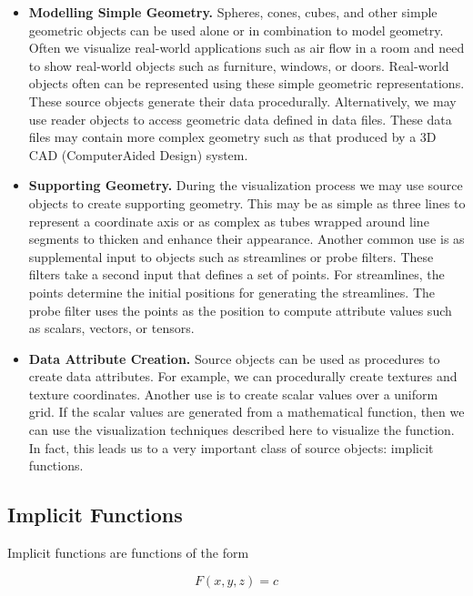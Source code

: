 \begin{itemize}

\item[] \textbf{Modelling Simple Geometry.}
Spheres, cones, cubes, and other simple geometric objects can be used alone or in combination to model geometry. Often we visualize real-world applications such as air flow in a room and need to show real-world objects such as furniture, windows, or doors.
Real-world objects often can be represented using these simple geometric representations. These source objects generate their data procedurally. Alternatively, we may use reader objects to access geometric data defined in data files. These data files may contain more complex geometry such as that produced by a 3D CAD (ComputerAided Design) system.

\item[] \textbf{Supporting Geometry.}
During the visualization process we may use source objects to create supporting geometry. This may be as simple as three lines to represent a coordinate axis or as complex as tubes wrapped around line segments to thicken and enhance their appearance. Another common use is as supplemental input to objects such as streamlines or probe filters. These filters take a second input that defines a set of points. For streamlines, the points determine the initial positions for generating the streamlines. The probe filter uses the points as the position to compute attribute values such as scalars, vectors, or tensors.

\item[] \textbf{Data Attribute Creation.}
Source objects can be used as procedures to create data attributes. For example, we can procedurally create textures and texture coordinates. Another use is to create scalar values over a uniform grid. If the scalar values are generated from a mathematical function, then we can use the visualization techniques described here to visualize the function. In fact, this leads us to a very important class of source objects: implicit functions.

\end{itemize}

\subsection{Implicit Functions}
\label{subsec:implicit_functions}

Implicit functions are functions of the form

\begin{equation}\label{eq:6.11}
F(x,y,z) = c
\end{equation}


